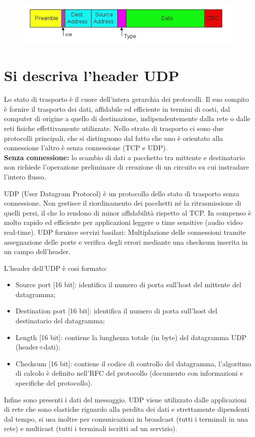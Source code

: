 \begin{figure}[H]
\centering
\includegraphics[scale=0.6]{res/img/47_FrameEthernet.png}
\end{figure}

\section{Si descriva l’header UDP}
Lo stato di trasporto è il cuore dell’intera gerarchia dei protocolli. Il suo compito è fornire il trasporto dei dati, affidabile ed efficiente in termini di costi, dal computer di origine a quello di destinazione, indipendentemente dalla rete o dalle reti fisiche effettivamente utilizzate.
Nello strato di trasporto ci sono due protocolli principali, che si distinguono dal fatto che uno è orientato alla connessione l’altro è senza connessione (TCP e UDP).\\
\textbf{Senza connessione:} lo scambio di dati a pacchetto tra mittente e destinatario non richiede l’operazione preliminare di creazione di un circuito su cui instradare l’intero flusso.

UDP (User Datagram Protocol) è un protocollo dello stato di trasporto senza connessione. Non gestisce il riordinamento dei pacchetti né la ritrasmissione di quelli persi, il che lo rendono di minor affidabilità rispetto al TCP. In compenso è molto rapido ed efficiente per applicazioni leggere o time sensitive (audio video real-time).
UDP fornisce servizi basilari: Multiplazione delle connessioni tramite assegnazione delle porte e verifica degli errori mediante una checksum inserita in un campo dell’header.

L’header dell’UDP è cosi formato:
\begin{itemize}
\item	Source port [16 bit]: identifica il numero di porta sull’host del mittente del datagramma;
\item	Destination port [16 bit]: identifica il numero di porta sull’host del destinatario del datagramma;
\item	Length [16 bit]: contiene la lunghezza totale (in byte) del datagramma UDP (header+dati);
\item	Checksum [16 bit]: contiene il codice di controllo del datagramma, l’algoritmo di calcolo è definito nell’RFC del protocollo (documento con informazioni e specifiche del protocollo).
\end{itemize}
Infine sono presenti i dati del messaggio.
UDP viene utilizzato dalle applicazioni di rete che sono elastiche riguardo alla perdita dei dati e strettamente dipendenti dal tempo, si usa inoltre per comunicazioni in broadcast (tutti i terminali in una rete) e multicast (tutti i terminali iscritti ad un servizio).

